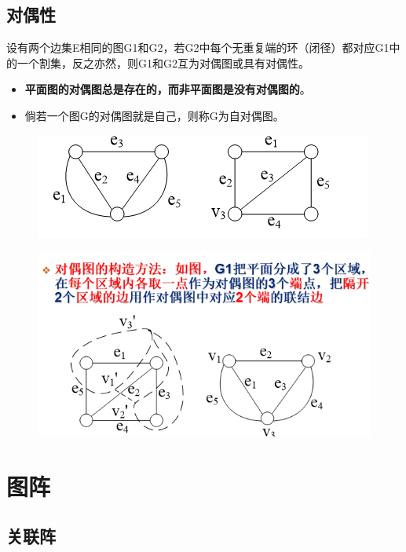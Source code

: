 \subsection{对偶性}
设有两个边集E相同的图G1和G2，若G2中每个无重复端的环（闭径）都对应G1中的一个割集，反之亦然，则G1和G2互为对偶图或具有对偶性。
\begin{itemize}
	\item \textbf{平面图的对偶图总是存在的，而非平面图是没有对偶图的}。
	\item 倘若一个图G的对偶图就是自己，则称G为自对偶图。
	
\end{itemize}
\begin{figure}[H]
	\centering
	\includegraphics[width=0.7\linewidth]{figures/screenshot057}
	\caption{}
	\label{fig:screenshot057}
\end{figure}
\begin{figure}[H]
	\centering
	\includegraphics[width=0.7\linewidth]{figures/screenshot058}
	\caption{}
	\label{fig:screenshot058}
\end{figure}
\section{图阵}
\subsection{关联阵}
